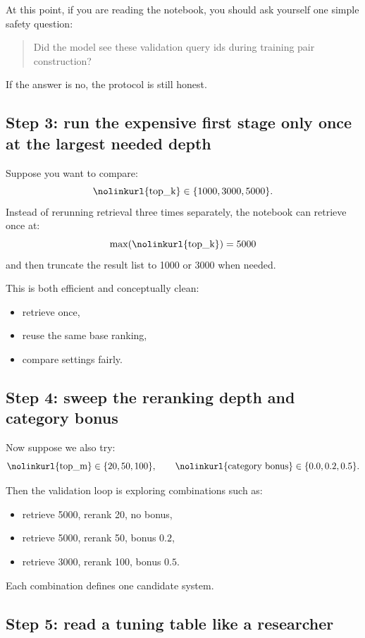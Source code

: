 \documentclass[10pt]{article}
\DeclareRobustCommand{\code}[1]{%
  \ifmmode
    \text{\nolinkurl{\detokenize{#1}}}%
  \else
    \nolinkurl{\detokenize{#1}}%
  \fi
}
\begin{document}
At this point, if you are reading the notebook, you should ask yourself one simple safety question:
\begin{quote}
Did the model see these validation query ids during training pair construction?
\end{quote}

If the answer is no, the protocol is still honest.

\subsection*{Step 3: run the expensive first stage only once at the largest needed depth}

Suppose you want to compare:
\[
\code{top_k} \in \{1000, 3000, 5000\}.
\]
Instead of rerunning retrieval three times separately, the notebook can retrieve once at:
\[
\max(\code{top_k}) = 5000
\]
and then truncate the result list to 1000 or 3000 when needed.

This is both efficient and conceptually clean:
\begin{itemize}
    \item retrieve once,
    \item reuse the same base ranking,
    \item compare settings fairly.
\end{itemize}

\subsection*{Step 4: sweep the reranking depth and category bonus}

Now suppose we also try:
\[
\code{top_m} \in \{20, 50, 100\}, \qquad
\code{category bonus} \in \{0.0, 0.2, 0.5\}.
\]

Then the validation loop is exploring combinations such as:
\begin{itemize}
    \item retrieve 5000, rerank 20, no bonus,
    \item retrieve 5000, rerank 50, bonus \(0.2\),
    \item retrieve 3000, rerank 100, bonus \(0.5\).
\end{itemize}

Each combination defines one candidate system.

\subsection*{Step 5: read a tuning table like a researcher}
\end{document}
